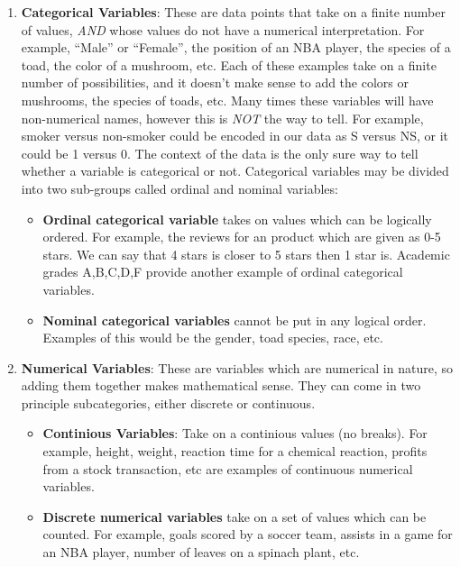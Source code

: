 \documentclass[
]{book}
\theoremstyle{definition}
\theoremstyle{definition}
\theoremstyle{definition}
\theoremstyle{definition}
\theoremstyle{remark}
\begin{document}
\begin{enumerate}
\def\labelenumi{\arabic{enumi}.}
\item
  \textbf{Categorical Variables}: These are data points that take on a finite number of values, \emph{AND} whose values do not have a numerical interpretation. For example, ``Male'' or ``Female'', the position of an NBA player, the species of a toad, the color of a mushroom, etc. Each of these examples take on a finite number of possibilities, and it doesn't make sense to add the colors or mushrooms, the species of toads, etc. Many times these variables will have non-numerical names, however this is \emph{NOT} the way to tell. For example, smoker versus non-smoker could be encoded in our data as S versus NS, or it could be 1 versus 0. The context of the data is the only sure way to tell whether a variable is categorical or not. Categorical variables may be divided into two sub-groups called ordinal and nominal variables:

  \begin{itemize}
  \item
    \textbf{Ordinal categorical variable} takes on values which can be logically ordered. For example, the reviews for an product which are given as 0-5 stars. We can say that 4 stars is closer to 5 stars then 1 star is. Academic grades A,B,C,D,F provide another example of ordinal categorical variables.
  \item
    \textbf{Nominal categorical variables} cannot be put in any logical order. Examples of this would be the gender, toad species, race, etc.
  \end{itemize}
\item
  \textbf{Numerical Variables}: These are variables which are numerical in nature, so adding them together makes mathematical sense. They can come in two principle subcategories, either discrete or continuous.

  \begin{itemize}
  \item
    \textbf{Continious Variables}: Take on a continious values (no breaks). For example, height, weight, reaction time for a chemical reaction, profits from a stock transaction, etc are examples of continuous numerical variables.
  \item
    \textbf{Discrete numerical variables} take on a set of values which can be counted. For example, goals scored by a soccer team, assists in a game for an NBA player, number of leaves on a spinach plant, etc.
  \end{itemize}
\end{enumerate}
\end{document}
